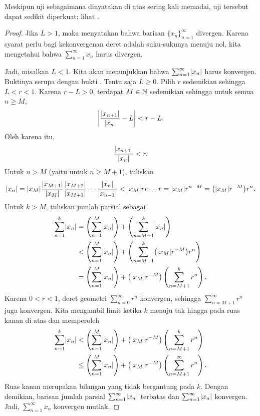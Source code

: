 Meskipun uji sebagaimana dinyatakan di atas sering kali memadai, uji tersebut dapat sedikit
diperkuat; lihat .

\begin{proof}
Jika $L > 1$, maka
 menyatakan bahwa barisan $\{ x_n \}_{n=1}^\infty$
divergen.  Karena syarat perlu bagi kekonvergenan deret adalah
suku-sukunya menuju nol, kita mengetahui bahwa $\sum_{n=1}^\infty x_n$ harus divergen.

Jadi, misalkan $L < 1$.
Kita akan menunjukkan bahwa $\sum_{n=1}^\infty \lvert {x_n} \rvert$ harus konvergen.
Buktinya serupa dengan bukti .  Tentu saja $L \geq
0$.  
Pilih
$r$ sedemikian sehingga $L < r < 1$.  Karena $r-L > 0$, terdapat $M \in {\mathbb{N}}$ sedemikian sehingga untuk
semua $n \geq M$,
\begin{equation*}
\left\lvert {\frac{\lvert {x_{n+1}} \rvert}{\lvert {x_n} \rvert} - L} \right\rvert < r-L .
\end{equation*}
Oleh karena itu,
\begin{equation*}
\frac{\lvert {x_{n+1}} \rvert}{\lvert {x_n} \rvert} < r .
\end{equation*}
Untuk $n > M$ (yaitu untuk $n \geq M+1$),
tuliskan
\begin{equation*}
\lvert {x_n} \rvert =
\lvert {x_M} \rvert
\frac{\lvert {x_{M+1}} \rvert}{\lvert {x_{M}} \rvert}
\frac{\lvert {x_{M+2}} \rvert}{\lvert {x_{M+1}} \rvert}
\cdots
\frac{\lvert {x_{n}} \rvert}{\lvert {x_{n-1}} \rvert}
<
\lvert {x_M} \rvert
r r \cdots r = \lvert {x_M} \rvert r^{n-M} =
\bigl(\lvert {x_M} \rvert r^{-M}\bigr) r^n .
\end{equation*}
Untuk $k > M$, tuliskan jumlah parsial sebagai
\begin{equation*}
\begin{split}
\sum_{n=1}^k \lvert {x_n} \rvert
& =
\left(\sum_{n=1}^{M} \lvert {x_n} \rvert \right)
+
\left(\sum_{n=M+1}^{k} \lvert {x_n} \rvert \right)
\\
& <
\left(\sum_{n=1}^{M} \lvert {x_n} \rvert \right)
+
\left(\sum_{n=M+1}^{k} 
\bigl(\lvert {x_M} \rvert r^{-M}\bigr) r^n
\right)
\\
& =
\left(\sum_{n=1}^{M} \lvert {x_n} \rvert \right)
+
\bigl(\lvert {x_M} \rvert r^{-M}\bigr)
\left( \sum_{n=M+1}^{k} r^n \right) .
\end{split}
\end{equation*}
Karena $0 < r < 1$, deret geometri
$\sum_{n=0}^{\infty} r^n$ konvergen, sehingga
$\sum_{n=M+1}^{\infty} r^n$ juga konvergen.  Kita mengambil
limit ketika $k$ menuju tak hingga pada ruas kanan di atas dan memperoleh
\begin{equation*}
\begin{split}
\sum_{n=1}^k \lvert {x_n} \rvert
& <
\left(\sum_{n=1}^{M} \lvert {x_n} \rvert \right)
+
\bigl(\lvert {x_M} \rvert r^{-M}\bigr)
\left( \sum_{n=M+1}^{k} r^n \right) 
\\
& \leq
\left(\sum_{n=1}^{M} \lvert {x_n} \rvert \right)
+
\bigl(\lvert {x_M} \rvert r^{-M}\bigr)
\left( \sum_{n=M+1}^{\infty} r^n \right) .
\end{split}
\end{equation*}
Ruas kanan merupakan bilangan yang tidak bergantung pada $k$.
Dengan demikian, barisan jumlah parsial $\sum_{n=1}^\infty \lvert {x_n} \rvert$ terbatas
dan $\sum_{n=1}^\infty \lvert {x_n} \rvert$ konvergen.  Jadi, $\sum_{n=1}^\infty x_n$
konvergen mutlak.
\end{proof}

